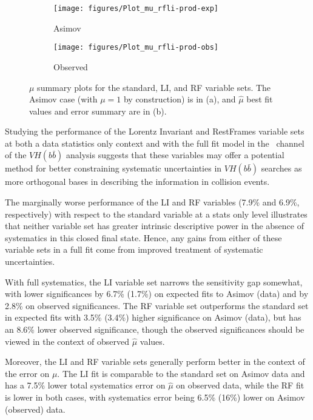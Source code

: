 \begin{figure}[!htbp]\captionsetup{justification=centering}
  \centering
  \begin{subfigure}[t]{0.49\textwidth}\centering\texttt{[image: figures/Plot\_mu\_rfli-prod-exp]}\caption{Asimov}\end{subfigure}
  \begin{subfigure}[t]{0.49\textwidth}\centering\texttt{[image: figures/Plot\_mu\_rfli-prod-obs]}\caption{Observed}\end{subfigure}
  \caption{$\mu$ summary plots for the standard, LI, and RF variable sets.  The Asimov case (with $\mu=1$ by construction) is in (a), and $\hat{\mu}$ best fit values and error summary are in (b).}
  \label{fig:MuhatSummary}
\end{figure}

Studying the performance of the Lorentz Invariant and RestFrames variable sets at both a data statistics only context and with the full fit model in the \ZH\, channel of the $VH\left(b\bar{b}\right)$ analysis suggests that these variables may offer a potential method for better constraining systematic uncertainties in $VH\left(b\bar{b}\right)$ searches as more orthogonal bases in describing the information in collision events.  

The marginally worse performance of the LI and RF variables (7.9\% and 6.9\%, respectively) with respect to the standard variable at a stats only level illustrates that neither variable set has greater intrinsic descriptive power in the absence of systematics in this closed final state.  Hence, any gains from either of these variable sets in a full fit come from improved treatment of systematic uncertainties.

With full systematics, the LI variable set narrows the sensitivity gap somewhat, with lower significances by 6.7\% (1.7\%) on expected fits to Asimov (data) and by 2.8\% on observed significances.  The RF variable set outperforms the standard set in expected fits with 3.5\% (3.4\%) higher significance on Asimov (data), but has an 8.6\% lower observed significance, though the observed significances should be viewed in the context of observed $\hat{\mu}$ values.

Moreover, the LI and RF variable sets generally perform better in the context of the error on $\mu$.  The LI fit is comparable to the standard set on Asimov data and has a 7.5\% lower total systematics error on $\hat{\mu}$ on observed data, while the RF fit is lower in both cases, with systematics error being 6.5\% (16\%) lower on Asimov (observed) data.  


